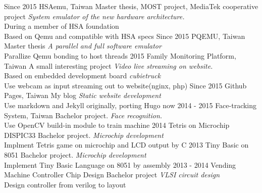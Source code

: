 \documentclass[]{friggeri-cv}
\begin{document}
\begin{entrylist}
  \entry
    {Since 2015}
    {HSAemu, Taiwan}
    {Master thesis, MOST project, MediaTek cooperative project}
    {\emph{System emulator of the new hardware architecture.} \\
	During a member of HSA foundation \\
	Based on Qemu and compatible with HSA specs}
  \entry
    {Since 2015}
    {PQEMU, Taiwan}
    {Master thesis}
    {\emph{A parallel and full software emulator}\\
	Parallize Qemu bonding to host threads}
  \entry
    {2015}
    {Family Monitoring Platform, Taiwan}
    {A small interesting project}
    {\emph{Video live streaming on website.} \\
	Based on embedded development board \emph{cubietruck}\\ 
	Use webcam as input streaming out to website(nginx, php)}
  \entry
    {Since 2015}
    {Github Pages, Taiwan}
    {My blog}
    {\emph{Static website development} \\
	Use markdown and Jekyll originally, porting Hugo now}
  \entry
    {2014 - 2015}
    {Face-tracking System, Taiwan}
    {Bachelor project.}
    {\emph{Face recognition.} \\ 
	Use OpenCV build-in module to train machine}
  \entry
	{2014}
	{Tetris on Microchip DISPIC33}
    {Bachelor project.}
    {\emph{Microchip development} \\
	Implment Tetris game on microchip and LCD output by C}
  \entry
    {2013}
	{Tiny Basic on 8051}
    {Bachelor project.}
    {\emph{Microchip development} \\
	Implement Tiny Basic Language on 8051 by assembly}
  \entry
    {2013 - 2014}
	{Vending Machine Controller Chip Design}
    {Bachelor project}
    {\emph{VLSI circuit design} \\
	Design controller from verilog to layout}
\end{entrylist}
\end{document}
